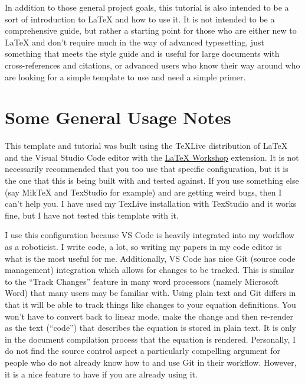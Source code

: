 \documentclass{thesis-dissertation}
\begin{document}
In addition to those general project goals, this tutorial is also intended to be a sort of introduction to \LaTeX{} and how to use it. It is not intended to be a comprehensive guide, but rather a starting point for those who are either new to \LaTeX{} and don't require much in the way of advanced typesetting, just something that meets the style guide and is useful for large documents with cross-references and citations, or advanced users who know their way around who are looking for a simple template to use and need a simple primer.

\section{Some General Usage Notes}
This template and tutorial was built using the TeXLive distribution of \LaTeX{} and the Visual Studio Code editor with the \href{https://marketplace.visualstudio.com/items?itemName=James-Yu.latex-workshop}{LaTeX Workshop} extension. It is not necessarily recommended that you too use that specific configuration, but it is the one that this is being built with and tested against. If you use something else (say MikTeX and TexStudio for example) and are getting weird bugs, then I can't help you. I have used my TexLive installation with TexStudio and it works fine, but I have not tested this template with it. 

I use this configuration because VS Code is heavily integrated into my workflow as a roboticist. I write code, a lot, so writing my papers in my code editor is what is the most useful for me. Additionally, VS Code has nice Git (source code management) integration which allows for changes to be tracked. This is similar to the ``Track Changes'' feature in many word processors (namely Microsoft Word) that many users may be familiar with. Using plain text and Git differs in that it will be able to track things like changes to your equation definitions. You won't have to convert back to linear mode, make the change and then re-render as the text (``code'') that describes the equation is stored in plain text. It is only in the document compilation process that the equation is rendered. Personally, I do not find the source control aspect a particularly compelling argument for people who do not already know how to and use Git in their workflow. However, it is a nice feature to have if you are already using it.
\end{document}
